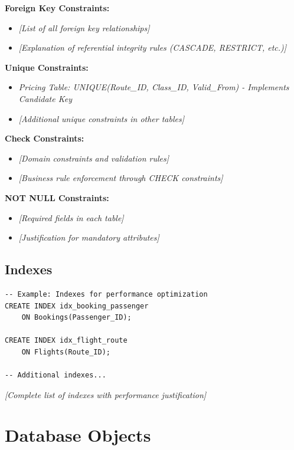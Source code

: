 \documentclass[12pt,a4paper,openany]{report}
\begin{document}
\textbf{Foreign Key Constraints:}
\begin{itemize}
    \item \textit{[List of all foreign key relationships]}
    \item \textit{[Explanation of referential integrity rules (CASCADE, RESTRICT, etc.)]}
\end{itemize}

\textbf{Unique Constraints:}
\begin{itemize}
    \item \textit{Pricing Table: UNIQUE(Route\_ID, Class\_ID, Valid\_From) - Implements Candidate Key}
    \item \textit{[Additional unique constraints in other tables]}
\end{itemize}

\textbf{Check Constraints:}
\begin{itemize}
    \item \textit{[Domain constraints and validation rules]}
    \item \textit{[Business rule enforcement through CHECK constraints]}
\end{itemize}

\textbf{NOT NULL Constraints:}
\begin{itemize}
    \item \textit{[Required fields in each table]}
    \item \textit{[Justification for mandatory attributes]}
\end{itemize}

\subsection{Indexes}

\begin{lstlisting}[caption={Sample Index Creation}]
-- Example: Indexes for performance optimization
CREATE INDEX idx_booking_passenger 
    ON Bookings(Passenger_ID);

CREATE INDEX idx_flight_route 
    ON Flights(Route_ID);

-- Additional indexes...
\end{lstlisting}

\textit{[Complete list of indexes with performance justification]}

\section{Database Objects}
\end{document}
